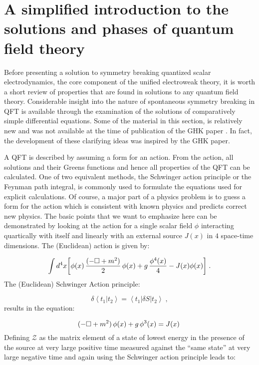 \documentclass[12pt]{article}
\newcommand{\bo}{\raise+0.0mm\hbox{$\Box$}}
\begin{document}
 \section{A simplified introduction to the solutions and phases of quantum field
   theory } \label{sec:2}

 Before presenting a solution to symmetry breaking quantized scalar
 electrodynamics, the core component of the unified electroweak theory, it is
 worth a short review of properties that are found in solutions to any quantum
 field theory. Considerable insight into the nature of spontaneous symmetry
 breaking in QFT is available through the examination of the solutions of
 comparatively simple differential equations. Some of the material in this
 section, is relatively new and was not available at the time of publication
 of the GHK paper \cite{ggg;1996,ggzg;2007}. In fact, the development of
 these clarifying ideas was inspired by the GHK paper.

A QFT is described by assuming a form for an action. From the action, all
solutions and their Greens functions and hence all properties of the QFT can
be calculated. One of two equivalent methods, the Schwinger action principle
or the Feynman path integral, is commonly used to formulate the equations used
for explicit calculations.  Of course, a major part of a physics problem is to
guess a form for the action which is consistent with known physics and
predicts correct new physics. The basic points that we want to emphasize here can be
demonstrated by looking at the action for a single scalar field $\phi$
interacting quartically with itself and linearly with an external source
$J(x)$ in $4$ space-time dimensions. The (Euclidean) action is given by:

 
\begin{equation*}
  \int d^4x \bigg[ \phi(x)\,\frac{(-\bo + m^2)}{2} \, \phi(x) +
  g\,\frac{\phi^4(x)}{4} -J(x)\phi(x)\bigg] \; . 
\end{equation*}
The (Euclidean) Schwinger Action principle:

\begin{equation*}
  \delta \left\langle t_1 \right|\left.t_2 \right\rangle = 
  \left\langle t_1 \right|\delta S\left|t_2 \right\rangle \; ,
\end{equation*}
%
results in the equation:

\begin{equation*}
  (-\bo + m^2)\, \phi(x) + g\, \phi^3(x) = J(x) \; 
\end{equation*}
Defining $\mathcal{Z}$ as the matrix element of a state of lowest energy in the presence
of the source at very large positive time measured against the ``same state''
at very large negative time and again using the Schwinger action principle
leads to:
\end{document}
